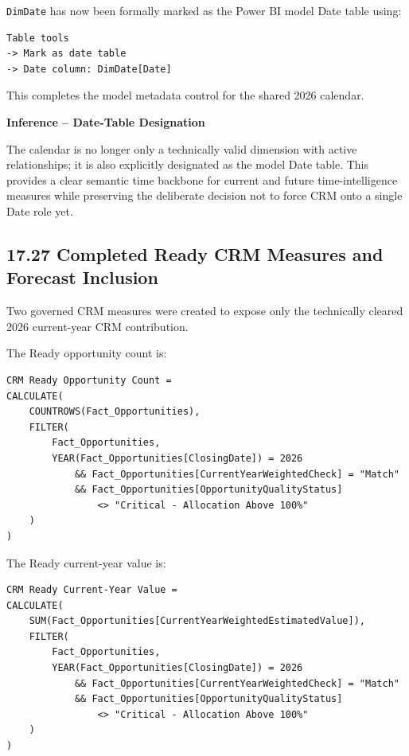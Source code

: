 \documentclass[11pt,a4paper]{article}
\begin{document}
\texttt{DimDate} has now been formally marked as the Power BI model Date table
using:

\begin{lstlisting}[style=powerquery]
Table tools
-> Mark as date table
-> Date column: DimDate[Date]
\end{lstlisting}

This completes the model metadata control for the shared 2026 calendar.

\begin{inferencebox}

\textbf{Inference -- Date-Table Designation}

The calendar is no longer only a technically valid dimension with active
relationships; it is also explicitly designated as the model Date table. This
provides a clear semantic time backbone for current and future time-intelligence
measures while preserving the deliberate decision not to force CRM onto a
single Date role yet.

\end{inferencebox}

\subsection{17.27 Completed Ready CRM Measures and Forecast Inclusion}

Two governed CRM measures were created to expose only the technically cleared
2026 current-year CRM contribution.

The Ready opportunity count is:

\begin{lstlisting}[style=powerquery]
CRM Ready Opportunity Count =
CALCULATE(
    COUNTROWS(Fact_Opportunities),
    FILTER(
        Fact_Opportunities,
        YEAR(Fact_Opportunities[ClosingDate]) = 2026
            && Fact_Opportunities[CurrentYearWeightedCheck] = "Match"
            && Fact_Opportunities[OpportunityQualityStatus]
                <> "Critical - Allocation Above 100%"
    )
)
\end{lstlisting}

The Ready current-year value is:

\begin{lstlisting}[style=powerquery]
CRM Ready Current-Year Value =
CALCULATE(
    SUM(Fact_Opportunities[CurrentYearWeightedEstimatedValue]),
    FILTER(
        Fact_Opportunities,
        YEAR(Fact_Opportunities[ClosingDate]) = 2026
            && Fact_Opportunities[CurrentYearWeightedCheck] = "Match"
            && Fact_Opportunities[OpportunityQualityStatus]
                <> "Critical - Allocation Above 100%"
    )
)
\end{lstlisting}
\end{document}
